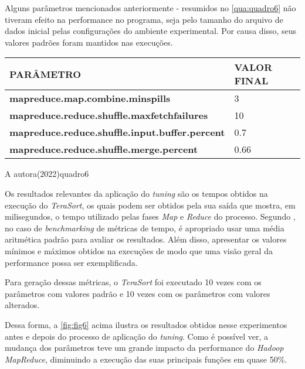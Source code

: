 Alguns parâmetros mencionados anteriormente - resumidos no \autoref{qua:quadro6} não tiveram efeito na performance no programa, seja pelo tamanho do arquivo de dados inicial pelas configurações do ambiente experimental. Por causa disso, seus valores padrões foram mantidos nas execuções.

{\footnotesize
  \centering
  \begin{tabular}{|p{75mm}|p{25mm}|}\hline
    \textbf{PARÂMETRO}                                     & \textbf{VALOR FINAL} \\\hline
    \textbf{mapreduce.map.combine.minspills}               & 3                    \\\hline
    \textbf{mapreduce.reduce.shuffle.maxfetchfailures}     & 10                   \\\hline
    \textbf{mapreduce.reduce.shuffle.input.buffer.percent} & 0.7                  \\\hline
    \textbf{mapreduce.reduce.shuffle.merge.percent}        & 0.66                 \\\hline
  \end{tabular}}
{A autora(2022)}{quadro6}{}{}

Os resultados relevantes da aplicação do \textit{\gls{tuning}} são os tempos obtidos na execução do \textit{TeraSort}, os quais podem ser obtidos pela sua saída que mostra, em milisegundos, o tempo utilizado pelas fases \textit{Map} e \textit{Reduce} do processo. Segundo \textcite{Fleming86}, no caso de \textit{\gls{benchmark}ing} de métricas de tempo, é apropriado usar uma média aritmética padrão para avaliar os resultados. Além disso, apresentar os valores mínimos e máximos obtidos na execuções de modo que uma visão geral da performance possa ser exemplificada.

Para geração dessas métricas, o \textit{TeraSort} foi executado 10 vezes com os parâmetros com valores padrão e 10 vezes com os parâmetros com valores alterados.


\newpage
Dessa forma, a \autoref{fig:fig6} acima ilustra os resultados obtidos nesse experimentos antes e depois do processo de aplicação do \textit{\gls{tuning}}. Como é possível ver, a mudança dos parâmetros teve um grande impacto da performance do \textit{Hadoop MapReduce}, diminuindo a execução das suas principais funções em quase 50\%. 
